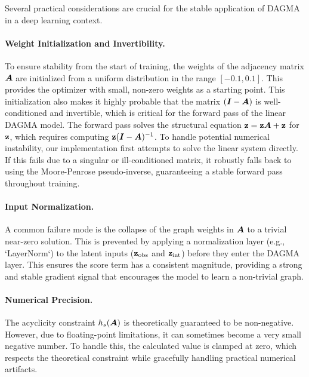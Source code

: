 Several practical considerations are crucial for the stable application of DAGMA in a deep learning context.

\paragraph{Weight Initialization and Invertibility.}
To ensure stability from the start of training, the weights of the adjacency matrix ${\bm{A}}$ are initialized from a uniform distribution in the range $[-0.1, 0.1]$.
This provides the optimizer with small, non-zero weights as a starting point.
This initialization also makes it highly probable that the matrix $({\bm{I}} - {\bm{A}})$ is well-conditioned and invertible, which is critical for the forward pass of the linear DAGMA model.
The forward pass solves the structural equation ${\mathbf{z}} = {\mathbf{z}}{\bm{A}} + {\mathbf{z}}$ for ${\mathbf{z}}$, which requires computing ${\mathbf{z}}({\bm{I}} - {\bm{A}})^{-1}$.
To handle potential numerical instability, our implementation first attempts to solve the linear system directly.
If this fails due to a singular or ill-conditioned matrix, it robustly falls back to using the Moore-Penrose pseudo-inverse, guaranteeing a stable forward pass throughout training.

\paragraph{Input Normalization.}
A common failure mode is the collapse of the graph weights in ${\bm{A}}$ to a trivial near-zero solution.
This is prevented by applying a normalization layer (e.g., `LayerNorm`) to the latent inputs (${\mathbf{z}}_{\text{obs}}$ and ${\mathbf{z}}_{\text{int}}$) before they enter the DAGMA layer.
This ensures the score term has a consistent magnitude, providing a strong and stable gradient signal that encourages the model to learn a non-trivial graph.

\paragraph{Numerical Precision.}
The acyclicity constraint $h_s({\bm{A}})$ is theoretically guaranteed to be non-negative.
However, due to floating-point limitations, it can sometimes become a very small negative number.
To handle this, the calculated value is clamped at zero, which respects the theoretical constraint while gracefully handling practical numerical artifacts.

